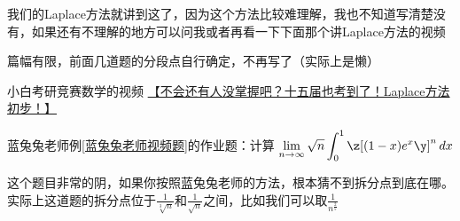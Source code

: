 我们的Laplace方法就讲到这了，因为这个方法比较难理解，我也不知道写清楚没有，如果还有不理解的地方可以问我或者再看一下下面那个讲Laplace方法的视频

篇幅有限，前面几道题的分段点自行确定，不再写了（实际上是懒）

小白考研竞赛数学的视频 \href{https://www.bilibili.com/video/BV1PC4y1S7RQ/?share_source=copy_web&vd_source=270527b9d8a800872b201575fba2747c}{【不会还有人没掌握吧？十五届也考到了！Laplace方法初步！】}



\vspace{1mm}
\begin{example}\label{蓝兔兔老师作业}
蓝兔兔老师例\ref{蓝兔兔老师视频题}的作业题：计算
$\displaystyle \lim_{n\to\infty}\sqrt{n}\int_{0}^{1}\z[(1-x)e^x\y]^n\,dx$
\end{example}
\vspace{1mm}

\begin{remark}
这个题目非常的阴，如果你按照蓝兔兔老师的方法，根本猜不到拆分点到底在哪。实际上这道题的拆分点位于$\frac{1}{\sqrt[3]{n}} $和$\frac{1}{\sqrt{n}}$之间，比如我们可以取$\frac{1}{n^{\frac{2}{5}}}$
\end{remark}

